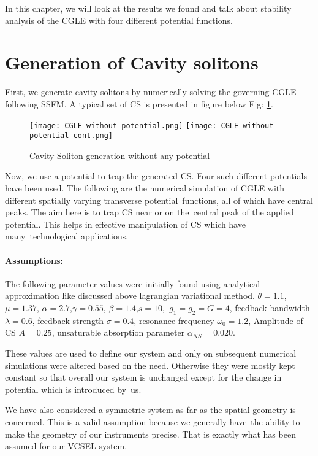 In this chapter, we will look at the results we found and talk about stability analysis of the CGLE with four different
potential functions.

\section{ Generation of Cavity solitons}
First, we generate cavity solitons by numerically solving the governing CGLE following SSFM. A typical set of CS is presented in figure below Fig: \ref{fig:CS without potential}.

\begin{figure}[H]
    \texttt{[image: CGLE without potential.png]}
    \texttt{[image: CGLE without potential cont.png]}
    \caption{Cavity Soliton generation without any potential}
    \label{fig:CS without potential}
\end{figure}

Now, we use a potential to trap the generated CS. Four such different potentials have been used. 
The following are the numerical simulation of CGLE with different spatially varying transverse potential\
functions, all of which have central peaks. The aim here is to trap CS near or on the\
central peak of the applied potential. This helps in effective manipulation of CS which have many\
technological applications.

\paragraph{Assumptions:} The following parameter values were initially found using analytical approximation like discussed above lagrangian variational method. 
$\theta = 1.1$, $\mu = 1.37$, $\alpha =2.7$,$\gamma =0.55$, $\beta = 1.4$,$s = 10$,\ 
$g_1=g_2=G=4$,
feedback bandwidth $\lambda = 0.6$, 
feedback strength $\sigma =0.4$, 
resonance frequency $\omega_0 = 1.2$,
Amplitude of CS $A=0.25$,
unsaturable absorption parameter $\alpha_{NS}= 0.020$.

These values are used to define our system and only on subsequent numerical simulations were altered based on the need.
Otherwise they were mostly kept constant so that overall our system is unchanged except for the change in potential which is introduced by\
us.  

We have also considered a symmetric system as far as the spatial geometry is concerned. This is a valid assumption because we generally have\
the ability to make the geometry of our instruments precise. That is exactly what has been assumed for our VCSEL system. 

